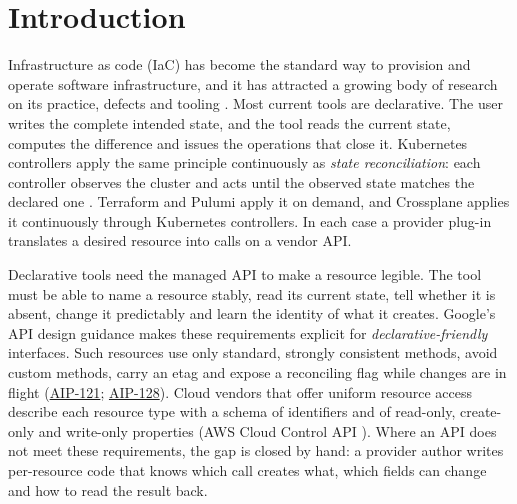 \section{Introduction}\label{sec:1}

Infrastructure as code (IaC) has become the standard way to provision and operate software
infrastructure, and it has attracted a growing body of research on its practice, defects and tooling
\citep{rahman2019a,guerriero2019}. Most current tools are
declarative. The user writes the complete intended state, and the tool reads the current state,
computes the difference and issues the operations that close it. Kubernetes controllers apply the
same principle continuously as \emph{state reconciliation}: each controller observes the cluster and acts
until the observed state matches the declared one
\citep{burns2016}. Terraform and Pulumi apply it on demand,
and Crossplane applies it continuously through Kubernetes controllers. In each case a provider
plug-in translates a desired resource into calls on a vendor API.

Declarative tools need the managed API to make a resource legible. The tool must be able to name a
resource stably, read its current state, tell whether it is absent, change it predictably and learn
the identity of what it creates. Google's API design guidance makes these requirements explicit for
\emph{declarative-friendly} interfaces. Such resources use only standard, strongly consistent methods,
avoid custom methods, carry an etag and expose a reconciling flag while changes are in flight
(\href{https://google.aip.dev/121}{AIP-121}; \href{https://google.aip.dev/128}{AIP-128}). Cloud vendors that
offer uniform resource access describe each resource type with a schema of identifiers and of
read-only, create-only and write-only properties (AWS Cloud Control API ). Where an API does not meet
these requirements, the gap is closed by hand: a provider author writes per-resource code that knows
which call creates what, which fields can change and how to read the result back.

